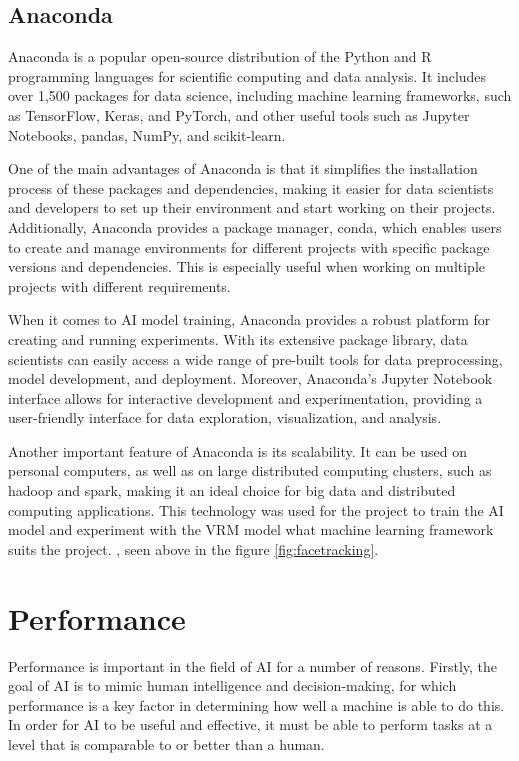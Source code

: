 \subsection{Anaconda}
Anaconda is a popular open-source distribution of the Python and R programming languages 
for scientific computing and data analysis. It includes over 1,500 packages for data science, 
including machine learning frameworks, such as TensorFlow, Keras, and PyTorch, 
and other useful tools such as Jupyter Notebooks, pandas, NumPy, and scikit-learn. \cite{anaconda}

One of the main advantages of Anaconda is that it simplifies the installation process of 
these packages and dependencies, making it easier for data scientists and developers to 
set up their environment and start working on their projects. Additionally, Anaconda 
provides a package manager, conda, which enables users to create and manage environments 
for different projects with specific package versions and dependencies. 
This is especially useful when working on multiple projects with different requirements.

When it comes to AI model training, Anaconda provides a robust platform for creating 
and running experiments. With its extensive package library, data scientists can 
easily access a wide range of pre-built tools for data preprocessing, model 
development, and deployment. Moreover, Anaconda's Jupyter Notebook interface 
allows for interactive development and experimentation, providing a 
user-friendly interface for data exploration, visualization, and analysis. \cite{anaconda2}

Another important feature of Anaconda is its scalability. It can be 
used on personal computers, as well as on large distributed computing clusters, 
such as \gls{hadoop} and \gls{spark}, making it an ideal choice for big data and distributed 
computing applications. This technology was used for the project to train the AI model 
and experiment with the VRM model what machine learning framework suits the project. ,
seen above in the figure \ref{fig:facetracking}.

\section{Performance}
Performance is important in the field of AI for a number of reasons. 
Firstly, the goal of AI is to mimic human intelligence and decision-making, 
for which performance is a key factor in determining how well a machine is able 
to do this. In order for AI to be useful and effective, it must be able to perform 
tasks at a level that is comparable to or better than a human. \cite{Performance}

